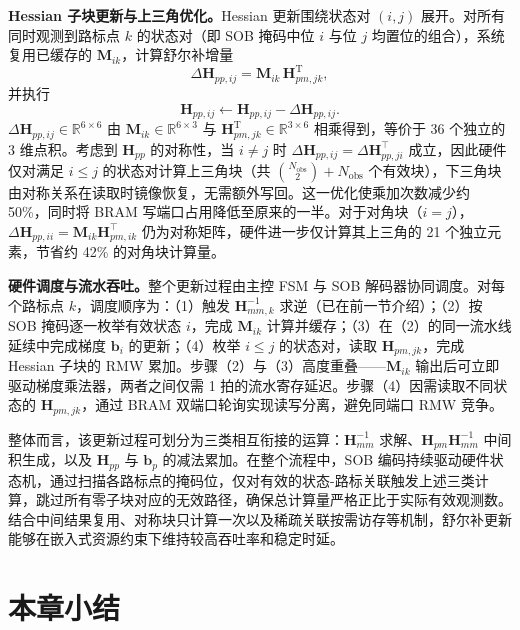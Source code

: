 \textbf{Hessian 子块更新与上三角优化。}Hessian 更新围绕状态对 $(i,j)$ 展开。对所有同时观测到路标点 $k$ 的状态对（即 SOB 掩码中位 $i$ 与位 $j$ 均置位的组合），系统复用已缓存的 $\mathbf{M}_{ik}$，计算舒尔补增量
\begin{equation}
\Delta \mathbf{H}_{pp,ij}=\mathbf{M}_{ik}\,\mathbf{H}_{pm,jk}^{\mathrm{T}},
\end{equation}
并执行
\begin{equation}
\mathbf{H}_{pp,ij} \leftarrow \mathbf{H}_{pp,ij} - \Delta \mathbf{H}_{pp,ij}.
\end{equation}
$\Delta \mathbf{H}_{pp,ij}\in\mathbb{R}^{6\times6}$ 由 $\mathbf{M}_{ik}\in\mathbb{R}^{6\times3}$ 与 $\mathbf{H}_{pm,jk}^{\mathrm{T}}\in\mathbb{R}^{3\times6}$ 相乘得到，等价于 36 个独立的 3 维点积。考虑到 $\mathbf{H}_{pp}$ 的对称性，当 $i\neq j$ 时 $\Delta\mathbf{H}_{pp,ij}=\Delta\mathbf{H}_{pp,ji}^{\top}$ 成立，因此硬件仅对满足 $i\leq j$ 的状态对计算上三角块（共 $\binom{N_{\mathrm{obs}}}{2}+N_{\mathrm{obs}}$ 个有效块），下三角块由对称关系在读取时镜像恢复，无需额外写回。这一优化使乘加次数减少约 50\%，同时将 BRAM 写端口占用降低至原来的一半。对于对角块（$i=j$），$\Delta\mathbf{H}_{pp,ii}=\mathbf{M}_{ik}\mathbf{H}_{pm,ik}^{\top}$ 仍为对称矩阵，硬件进一步仅计算其上三角的 21 个独立元素，节省约 42\% 的对角块计算量。

\textbf{硬件调度与流水吞吐。}整个更新过程由主控 FSM 与 SOB 解码器协同调度。对每个路标点 $k$，调度顺序为：（1）触发 $\mathbf{H}_{mm,k}^{-1}$ 求逆（已在前一节介绍）；（2）按 SOB 掩码逐一枚举有效状态 $i$，完成 $\mathbf{M}_{ik}$ 计算并缓存；（3）在（2）的同一流水线延续中完成梯度 $\mathbf{b}_i$ 的更新；（4）枚举 $i\leq j$ 的状态对，读取 $\mathbf{H}_{pm,jk}$，完成 Hessian 子块的 RMW 累加。步骤（2）与（3）高度重叠——$\mathbf{M}_{ik}$ 输出后可立即驱动梯度乘法器，两者之间仅需 1 拍的流水寄存延迟。步骤（4）因需读取不同状态的 $\mathbf{H}_{pm,jk}$，通过 BRAM 双端口轮询实现读写分离，避免同端口 RMW 竞争。

整体而言，该更新过程可划分为三类相互衔接的运算：$\mathbf{H}_{mm}^{-1}$ 求解、$\mathbf{H}_{pm}\mathbf{H}_{mm}^{-1}$ 中间积生成，以及 $\mathbf{H}_{pp}$ 与 $\mathbf{b}_p$ 的减法累加。在整个流程中，SOB 编码持续驱动硬件状态机，通过扫描各路标点的掩码位，仅对有效的状态-路标关联触发上述三类计算，跳过所有零子块对应的无效路径，确保总计算量严格正比于实际有效观测数。结合中间结果复用、对称块只计算一次以及稀疏关联按需访存等机制，舒尔补更新能够在嵌入式资源约束下维持较高吞吐率和稳定时延。

\section{本章小结}


